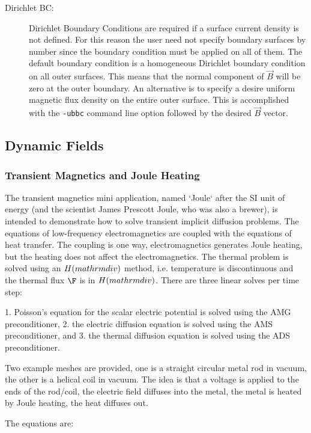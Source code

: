 \documentclass{article}
\begin{document}
\begin{description}
\item[Dirichlet BC:] Dirichlet Boundary Conditions are required if a
  surface current density is not defined.  For this reason the user
  need not specify boundary surfaces by number since the boundary
  condition must be applied on all of them.  The default boundary
  condition is a homogeneous Dirichlet boundary condition on all outer
  surfaces.  This means that the normal component of $\vec{B}$ will be
  zero at the outer boundary.  An alternative is to specify a desire
  uniform magnetic flux density on the entire outer surface.  This is
  accomplished with the {\tt -ubbc} command line option followed by
  the desired $\vec{B}$ vector.
\end{description}


\subsection{Dynamic Fields}
\subsubsection{Transient Magnetics and Joule Heating}
The transient magnetics mini application, named `Joule` after the SI unit of energy (and the
scientist James Prescott Joule, who was also a brewer), is intended to demonstrate how to solve
transient implicit diffusion problems. The equations of low-frequency electromagnetics are coupled
with the equations of heat transfer. The coupling is one way, electromagnetics generates Joule
heating, but the heating does not affect the electromagnetics.  The thermal problem
is solved using an $H(\\mathrm{div})$ method, i.e. temperature is discontinuous and the
thermal flux $\F$ is in $H(\\mathrm{div})$.
There are three linear solves per time step:

1. Poisson's equation for the scalar electric potential is solved using the AMG
 preconditioner,
2. the electric diffusion equation is solved using the AMS preconditioner, and
3. the thermal diffusion equation is solved using the ADS preconditioner.

Two example meshes are provided, one is a straight circular metal rod in vacuum, the other is a helical
coil in vacuum. The idea is that a voltage is applied to the ends of the rod/coil, the electric field diffuses
into the metal, the metal is heated by Joule heating, the heat diffuses out.

The equations are:
\end{document}
